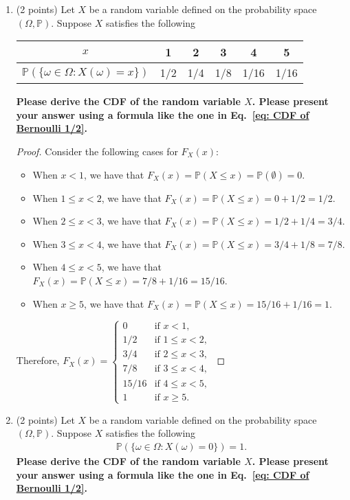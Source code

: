 \documentclass[11pt]{article}
\newcommand{\p}{\mathbb{P}}
\begin{document}
\begin{enumerate}
\item (2 points) Let $X$ be a random variable defined on the probability space $(\Omega,\mathbb{P})$. Suppose $X$ satisfies the following
\begin{table}[h]
\centering
\begin{tabular}{c|ccccc} \hline
$x$ & 1 & 2 & 3 & 4 & 5 \\\hline
$\mathbb{P}(\{\omega\in\Omega: X(\omega)=x\})$ & 1/2 & 1/4 & 1/8 & 1/16 & 1/16 \\\hline
\end{tabular}
\end{table}

\textbf{Please derive the CDF of the random variable $X$. Please present your answer using a formula like the one in Eq.~\eqref{eq: CDF of Bernoulli 1/2}.}

\begin{proof}
    Consider the following cases for \(F_X(x)\):
    \begin{itemize}
        \item When \(x<1\), we have that \(F_X(x)=\p(X\leq x)=\p(\emptyset)=0\).
        \item When \(1\leq x<2\), we have that \(F_X(x)=\p(X\leq x)=0+1/2 = 1/2\).
        \item When \(2\leq x<3\), we have that \(F_X(x)=\p(X\leq x)=1/2 + 1/4 = 3/4\).
        \item When \(3\leq x<4\), we have that \(F_X(x)=\p(X\leq x)=3/4+1/8=7/8\).
        \item When \(4\leq x<5\), we have that \(F_X(x)=\p(X\leq x)=7/8+1/16=15/16\).
        \item When \(x\geq 5\), we have that \(F_X(x)=\p(X\leq x)=15/16+1/16=1\).
    \end{itemize}
    Therefore, \(F_X(x)=
    \begin{cases}
        0 & \text{if } x<1,\\
        1/2 & \text{if } 1\leq x<2,\\
        3/4 & \text{if } 2\leq x<3,\\
        7/8 & \text{if } 3\leq x<4,\\
        15/16 & \text{if } 4\leq x<5,\\
        1 & \text{if } x\geq 5.
    \end{cases}\)
\end{proof}

\item (2 points) Let $X$ be a random variable defined on the probability space $(\Omega,\mathbb{P})$. Suppose $X$ satisfies the following
\begin{align*}
    \mathbb{P}(\{\omega\in\Omega: X(\omega)=0\})=1.
\end{align*}
\textbf{Please derive the CDF of the random variable $X$. Please present your answer using a formula like the one in Eq.~\eqref{eq: CDF of Bernoulli 1/2}.}


\end{enumerate}
\end{document}
